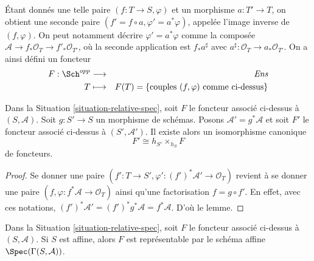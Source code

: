 \medskip\noindent
Étant donnés une telle paire
$(f : T \to S, \varphi)$ et un morphisme $a : T' \to T$, on obtient
une seconde paire $(f' = f \circ a, \varphi' = a^*\varphi)$, appelée
l'image inverse de $(f, \varphi)$. On peut notamment décrire
$\varphi' = a^*\varphi$ comme la composée
$\mathcal{A} \to f_*\mathcal{O}_T \to f'_*\mathcal{O}_{T'}$,
où la seconde application est $f_*a^\sharp$ avec
$a^\sharp : \mathcal{O}_T \to a_*\mathcal{O}_{T'}$.
On a ainsi défini un foncteur
\begin{eqnarray}
\label{equation-spec}
F : \Sch^{opp} & \longrightarrow & \textit{Ens} \\
T & \longmapsto & F(T) = \{\text{couples }(f, \varphi) \text{ comme ci-dessus}\}
\nonumber
\end{eqnarray}

\begin{lemma}
\label{lemma-spec-base-change}
Dans la Situation \ref{situation-relative-spec}, soit $F$ le foncteur
associé ci-dessus à $(S, \mathcal{A})$.
Soit $g : S' \to S$ un morphisme de schémas.
Posons $\mathcal{A}' = g^*\mathcal{A}$ et soit $F'$ le
foncteur associé ci-dessus à $(S', \mathcal{A}')$.
Il existe alors un isomorphisme canonique
$$
F' \cong h_{S'} \times_{h_S} F
$$
de foncteurs.
\end{lemma}

\begin{proof}
Se donner une paire $(f' : T \to S', \varphi' : (f')^*\mathcal{A}' \to \mathcal{O}_T)$
revient à se donner une paire $(f, \varphi : f^*\mathcal{A} \to \mathcal{O}_T)$
ainsi qu'une factorisation $f = g \circ f'$. En effet, avec ces notations,
$(f')^* \mathcal{A}' = (f')^*g^*\mathcal{A} = f^*\mathcal{A}$.
D'où le lemme.
\end{proof}

\begin{lemma}
\label{lemma-spec-affine}
Dans la Situation \ref{situation-relative-spec}, soit $F$ le foncteur
associé ci-dessus à $(S, \mathcal{A})$.
Si $S$ est affine, alors $F$ est représentable par le
schéma affine $\Spec(\Gamma(S, \mathcal{A}))$.
\end{lemma}

